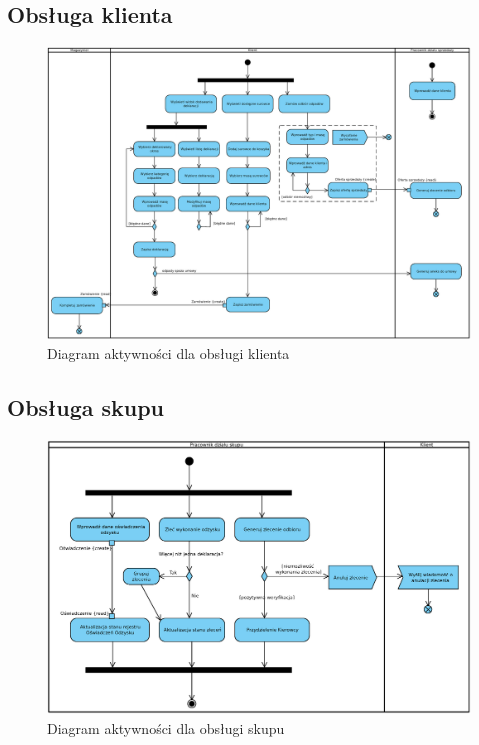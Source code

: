 \subsection{Obsługa klienta}
\begin{landscape}
		\begin{figure}[H]
			\centering
			\centerline{\includegraphics[width=24cm]{img/AD/klient.eps}}
		\caption{Diagram aktywności dla obsługi klienta}
		\end{figure}
\end{landscape}

\subsection{Obsługa skupu}
	\begin{figure}[H]
		\centering
		\centerline{\includegraphics[width=1.2\textwidth]{img/AD/skup.eps}}
		\caption{Diagram aktywności dla obsługi skupu}
	\end{figure}

